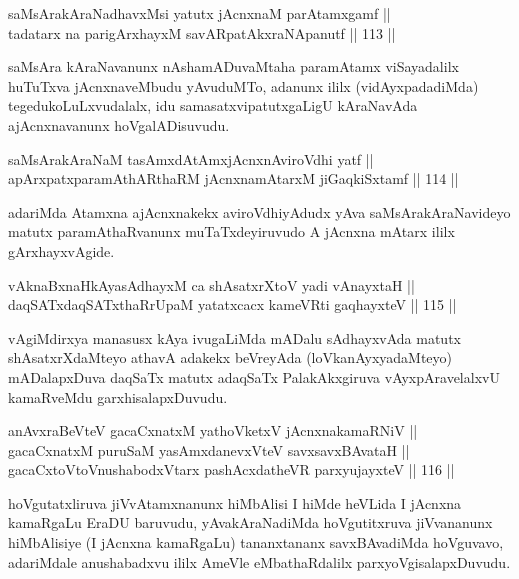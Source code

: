 \begin{shl}
saMsArakAraNadhavxMsi yatutx jAcnxnaM parAtamxgamf ||  \\
tadatarx na parigArxhayxM savARpatAkxraNApanutf \hfill || 113 ||  
\end{shl}

\begin{artha}
saMsAra kAraNavanunx nAshamADuvaMtaha paramAtamx viSayadalilx huTuTxva
jAcnxnaveMbudu yAvuduMTo, adanunx ililx (vidAyxpadadiMda)
tegedukoLuLxvudalalx, idu samasatxvipatutxgaLigU kAraNavAda
ajAcnxnavanunx hoVgalADisuvudu.
\end{artha}

\begin{shl}
saMsArakAraNaM tasAmxdAtAmxjAcnxnAviroVdhi yatf || \\
apArxpatxparamAthARthaRM jAcnxnamAtarxM jiGaqkiSxtamf \hfill || 114 ||  
\end{shl}

\begin{artha}
adariMda Atamxna ajAcnxnakekx aviroVdhiyAdudx yAva
saMsArakAraNavideyo matutx paramAthaRvanunx muTaTxdeyiruvudo A jAcnxna
mAtarx ililx gArxhayxvAgide.
\end{artha}

\begin{shl}
vAknaBxnaHkAyasAdhayxM ca shAsatxrXtoV yadi vA\s nayxtaH || \\
daqSATxdaqSATxthaRrUpaM yatatxcacx kameVRti gaqhayxteV \hfill || 115 ||  
\end{shl}

\begin{artha}
vAgiMdirxya manasusx kAya ivugaLiMda mADalu sAdhayxvAda matutx
shAsatxrXdaMteyo athavA adakekx beVreyAda (loVkanAyxyadaMteyo)
mADalapxDuva daqSaTx matutx adaqSaTx PalakAkxgiruva vAyxpAravelalxvU
kamaRveMdu garxhisalapxDuvudu.
\end{artha}

\begin{shl}
anAvxraBeVteV gacaCxnatxM yathoVketxV jAcnxnakamaRNiV || \\
gacaCxnatxM puruSaM yasAmxdanevxVteV savxsavxBAvataH || \\
gacaCxtoV\s toV\s nushabodxV\s tarx pashAcxdatheVR parxyujayxteV \hfill || 116 ||  
\end{shl}

\begin{artha}
hoVgutatxliruva jiVvAtamxnanunx hiMbAlisi I hiMde heVLida I jAcnxna
kamaRgaLu EraDU baruvudu, yAvakAraNadiMda hoVgutitxruva jiVvananunx
hiMbAlisiye (I jAcnxna kamaRgaLu) tananxtananx savxBAvadiMda
hoVguvavo, adariMdale anushabadxvu ililx AmeVle eMbathaRdalilx
parxyoVgisalapxDuvudu.
\end{artha}

